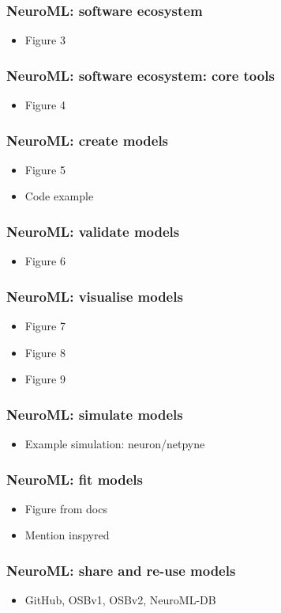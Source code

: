 \begin{frame}[c]
  \frametitle{NeuroML: software ecosystem}
  \begin{itemize}
    \item Figure 3
  \end{itemize}
\end{frame}
\begin{frame}[c]
  \frametitle{NeuroML: software ecosystem: core tools}
  \begin{itemize}
    \item Figure 4
  \end{itemize}
\end{frame}
\begin{frame}[c]
  \frametitle{NeuroML: create models}
  \begin{itemize}
    \item Figure 5
    \item Code example
  \end{itemize}
\end{frame}
\begin{frame}[c]
  \frametitle{NeuroML: validate models}
  \begin{itemize}
    \item Figure 6
  \end{itemize}
\end{frame}
\begin{frame}[c]
  \frametitle{NeuroML: visualise models}
  \begin{itemize}
    \item Figure 7
    \item Figure 8
    \item Figure 9
  \end{itemize}
\end{frame}
\begin{frame}[c]
  \frametitle{NeuroML: simulate models}
  \begin{itemize}
    \item Example simulation: neuron/netpyne
  \end{itemize}
\end{frame}
\begin{frame}[c]
  \frametitle{NeuroML: fit models}
  \begin{itemize}
    \item Figure from docs
    \item Mention inspyred
  \end{itemize}
\end{frame}
\begin{frame}[c]
  \frametitle{NeuroML: share and re-use models}
  \begin{itemize}
    \item GitHub, OSBv1, OSBv2, NeuroML-DB
  \end{itemize}
\end{frame}
